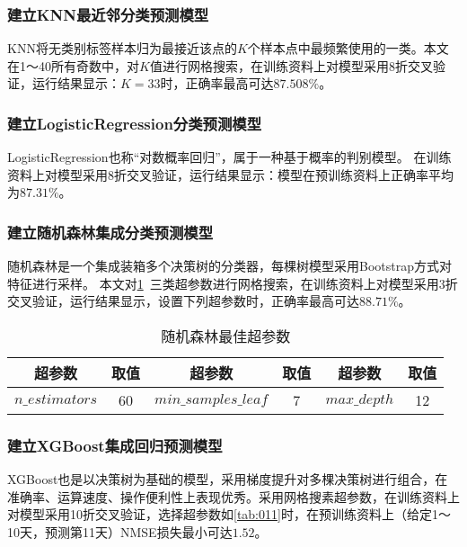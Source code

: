 \documentclass[withoutpreface,bwprint]{cumcmthesis}
\begin{document}
\subsubsection{建立KNN最近邻分类预测模型}

KNN将无类别标签样本归为最接近该点的$K$个样本点中最频繁使用的一类。本文在1～40所有奇数中，对$K$值进行网格搜索，在训练资料上对模型采用8折交叉验证，运行结果显示：$K=33$时，正确率最高可达$87.508\%$。

\subsubsection{建立LogisticRegression分类预测模型}

LogisticRegression也称“对数概率回归”，属于一种基于概率的判别模型。
在训练资料上对模型采用8折交叉验证，运行结果显示：模型在预训练资料上正确率平均为$87.31\%$。

\subsubsection{建立随机森林集成分类预测模型}

随机森林是一个集成装箱多个决策树的分类器，每棵树模型采用Bootstrap方式对特征进行采样。
本文对\cref{tab:010}~三类超参数进行网格搜索，在训练资料上对模型采用3折交叉验证，运行结果显示，设置下列超参数时，正确率最高可达$88.71\%$。

\begin{table}[!htbp]
    \caption{随机森林最佳超参数}\label{tab:010} \centering
    \begin{tabular}{cccccc}
        \toprule[1.5pt]
        超参数             & 取值 & 超参数                  & 取值 & 超参数          & 取值 \\
        \midrule[1pt]
        $n\_estimators$ & 60 & $min\_samples\_leaf$ & 7  & $max\_depth$ & 12 \\
        \bottomrule[1.5pt]
    \end{tabular}
\end{table}

\subsubsection{建立XGBoost集成回归预测模型}

XGBoost也是以决策树为基础的模型，采用梯度提升对多棵决策树进行组合，在准确率、运算速度、操作便利性上表现优秀。采用网格搜素超参数，在训练资料上对模型采用10折交叉验证，选择超参数如\cref{tab:011}时，在预训练资料上（给定1～10天，预测第11天）NMSE损失最小可达$1.52$。
\end{document}
